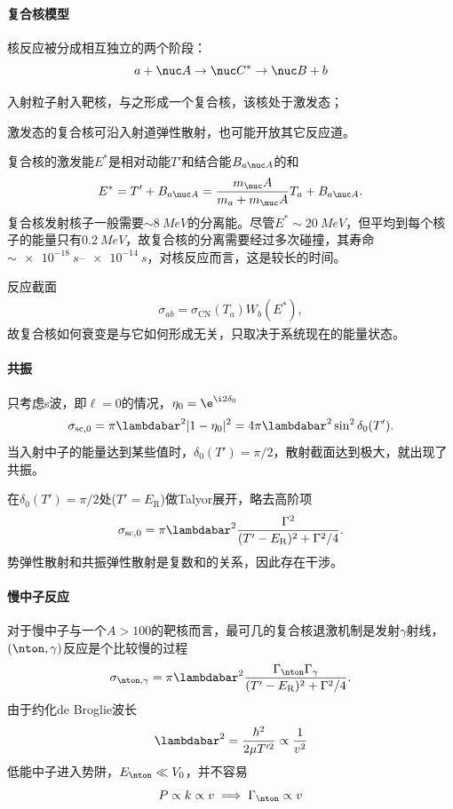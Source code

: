 \paragraph{复合核模型}核反应被分成相互独立的两个阶段：
\[
	a+\nuc A\to\nuc C^\ast\to\nuc B+b
\]
\begin{compactenum}
	\item 入射粒子射入靶核，与之形成一个复合核，该核处于激发态；
	\item 激发态的复合核可沿入射道弹性散射，也可能开放其它反应道。
\end{compactenum}
复合核的激发能$E^\ast$是相对动能$T'$和结合能$B_{a\nuc A}$的和
\begin{align}
	E^\ast=T'+B_{a\nuc A}=\frac{m_\nuc A}{m_a+m_\nuc A}T_a+B_{a\nuc A}.
\end{align}
复合核发射核子一般需要$\sim\SI{8}{MeV}$的分离能。尽管$E^\ast\sim\SI{20}{MeV}$，但平均到每个核子的能量只有$\SI{0.2}{MeV}$，故复合核的分离需要经过多次碰撞，其寿命$\sim\SIrange{e-18}{e-14}{s}$，对核反应而言，这是较长的时间。

反应截面
\begin{align}
	\sigma_{ab}=\sigma_{\mathrm{CN}}(T_a)W_b(E^\ast),
\end{align}
故复合核如何衰变是与它如何形成无关，只取决于系统现在的能量状态。
\paragraph{共振}只考虑s波，即$\ell=0$的情况，$\eta_0=\e^{\i2\delta_0}$
\[
	\sigma_{\mathrm{sc},0}=\pi\lambdabar^2|1-\eta_0|^2=4\pi\lambdabar^2\sin^2\delta_0(T').
\]
当入射中子的能量达到某些值时，$\delta_0(T')=\pi/2$，散射截面达到极大，就出现了共振。

在$\delta_0(T')=\pi/2$处($T'=E_\mathrm R$)做Talyor展开，略去高阶项
\[
	\sigma_{\mathrm{sc},0}=\pi\lambdabar^2\frac{\Gamma^2}{(T'-E_\mathrm R)^2+\Gamma^2/4}.
\]
势弹性散射和共振弹性散射是复数和的关系，因此存在干涉。
\paragraph{慢中子反应}对于慢中子与一个$A>100$的靶核而言，最可几的复合核退激机制是发射$\gamma$射线，$(\nton,\gamma)$反应是个比较慢的过程
\[
	\sigma_{\nton,\gamma}=\pi\lambdabar^2\frac{\Gamma_\nton\Gamma_\gamma}{(T'-E_\mathrm R)^2+\Gamma^2/4}.
\]
由于约化de Broglie波长
\[
	\lambdabar^2=\frac{\hbar^2}{2\mu T'^2}\propto\frac1{v^2}
\]
低能中子进入势阱，$E_\nton\ll V_0$，并不容易
\[
	P\propto k\propto v\implies\Gamma_\nton\propto v
\]

